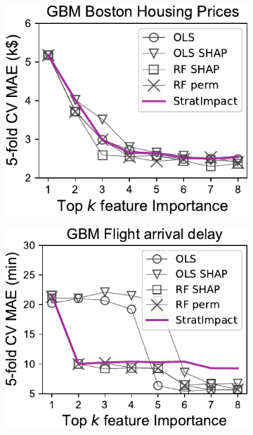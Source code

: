 \documentclass[11pt]{article}
\begin{document}
\begin{figure}
\centering
\begin{subfigure}{.24\textwidth}
    \centering
\includegraphics[scale=0.48]{images/boston-topk-GBM-Importance.pdf}
\end{subfigure}%
\hfill
\begin{subfigure}{.23\textwidth}
    \centering
\includegraphics[scale=0.48]{images/flights-topk-GBM-Importance.pdf}
\end{subfigure}
\hfill
\begin{subfigure}{.25\textwidth}

\end{subfigure}
\end{figure}
\end{document}
